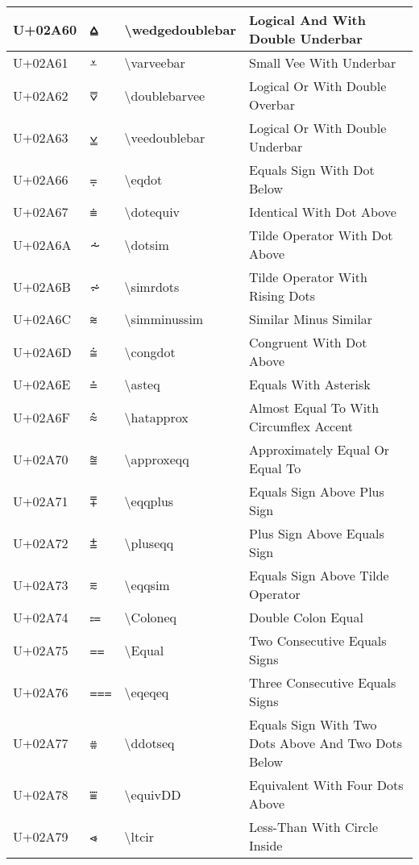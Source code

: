 \begin{table}[h]
\begin{tabulary}{\linewidth}{|L|L|L|L|}
\hline
U+02A60 & ⩠ & {\textbackslash}wedgedoublebar & Logical And With Double Underbar \\
\hline
U+02A61 & ⩡ & {\textbackslash}varveebar & Small Vee With Underbar \\
\hline
U+02A62 & ⩢ & {\textbackslash}doublebarvee & Logical Or With Double Overbar \\
\hline
U+02A63 & ⩣ & {\textbackslash}veedoublebar & Logical Or With Double Underbar \\
\hline
U+02A66 & ⩦ & {\textbackslash}eqdot & Equals Sign With Dot Below \\
\hline
U+02A67 & ⩧ & {\textbackslash}dotequiv & Identical With Dot Above \\
\hline
U+02A6A & ⩪ & {\textbackslash}dotsim & Tilde Operator With Dot Above \\
\hline
U+02A6B & ⩫ & {\textbackslash}simrdots & Tilde Operator With Rising Dots \\
\hline
U+02A6C & ⩬ & {\textbackslash}simminussim & Similar Minus Similar \\
\hline
U+02A6D & ⩭ & {\textbackslash}congdot & Congruent With Dot Above \\
\hline
U+02A6E & ⩮ & {\textbackslash}asteq & Equals With Asterisk \\
\hline
U+02A6F & ⩯ & {\textbackslash}hatapprox & Almost Equal To With Circumflex Accent \\
\hline
U+02A70 & ⩰ & {\textbackslash}approxeqq & Approximately Equal Or Equal To \\
\hline
U+02A71 & ⩱ & {\textbackslash}eqqplus & Equals Sign Above Plus Sign \\
\hline
U+02A72 & ⩲ & {\textbackslash}pluseqq & Plus Sign Above Equals Sign \\
\hline
U+02A73 & ⩳ & {\textbackslash}eqqsim & Equals Sign Above Tilde Operator \\
\hline
U+02A74 & ⩴ & {\textbackslash}Coloneq & Double Colon Equal \\
\hline
U+02A75 & ⩵ & {\textbackslash}Equal & Two Consecutive Equals Signs \\
\hline
U+02A76 & ⩶ & {\textbackslash}eqeqeq & Three Consecutive Equals Signs \\
\hline
U+02A77 & ⩷ & {\textbackslash}ddotseq & Equals Sign With Two Dots Above And Two Dots Below \\
\hline
U+02A78 & ⩸ & {\textbackslash}equivDD & Equivalent With Four Dots Above \\
\hline
U+02A79 & ⩹ & {\textbackslash}ltcir & Less-Than With Circle Inside \\

\end{tabulary}
\end{table}
